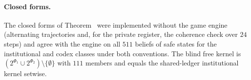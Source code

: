 \paragraph{Closed forms.}
The closed forms of Theorem~ were implemented without the game engine (alternating trajectories and, for the private register, the coherence check over $24$ steps) and agree with the engine on all $511$ beliefs of safe states for the institutional and codex classes under both conventions. The blind free kernel is $(2^{\Phi_1}\cup 2^{\Phi_2})\setminus\{\emptyset\}$ with $111$ members and equals the shared-ledger institutional kernel setwise.
